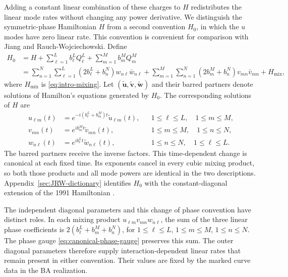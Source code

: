 Adding a constant linear combination of these charges to $H$
redistributes the linear mode rates without changing any power
derivative. We distinguish the symmetric-phase Hamiltonian $H$ from
a second convention $H_0$, in which the $u$ modes have zero linear
rate. This convention is convenient for comparison with Jiang and
Rauch-Wojciechowski. Define
\begin{align}\label{eq:canonical-H0}
 H_0&=H+\sum_{\ell=1}^{L}b_\ell^LQ_\ell^L
        +\sum_{m=1}^{M}b_m^MQ_m^M\nonumber\\
 &=\sum_{n=1}^{N}\sum_{\ell=1}^{L}
       (2b_\ell^L+b_n^N)w_{n\ell}\bar{w}_{n\ell}
   +\sum_{m=1}^{M}\sum_{n=1}^{N}
       (2b_m^M+b_n^N)v_{mn}\bar{v}_{mn}+H_{\mathrm{mix}},
\end{align}
where $H_{\mathrm{mix}}$ is \cref{eq:intro-mixing}. Let
$(\tilde{\boldsymbol u},\tilde{\boldsymbol v},\tilde{\boldsymbol w})$
and their barred partners denote solutions of Hamilton's equations
generated by $H_0$. The corresponding solutions of $H$ are
\begin{equation}\label{eq:canonical-phase-gauge}
\begin{aligned}
 u_{\ell m}(t)&=e^{-i(b_\ell^L+b_m^M)t}\tilde u_{\ell m}(t),
 &&1\leq\ell\leq L,\quad1\leq m\leq M,\\
 v_{mn}(t)&=e^{ib_m^Mt}\tilde v_{mn}(t),
 &&1\leq m\leq M,\quad1\leq n\leq N,\\
 w_{n\ell}(t)&=e^{ib_\ell^Lt}\tilde w_{n\ell}(t),
 &&1\leq n\leq N,\quad1\leq\ell\leq L.
\end{aligned}
\end{equation}
The barred partners receive the
inverse factors. This time-dependent change is canonical at each
fixed time. Its exponents cancel in every cubic mixing product, so
both those products and all mode powers are identical in the two
descriptions. Appendix~\ref{sec:JRW-dictionary} identifies $H_0$ with the
constant-diagonal extension of the 1991 Hamiltonian \cite{JRW1991}.

The independent diagonal parameters and this change of phase convention
have distinct roles. In each mixing product $u_{\ell m}v_{mn}w_{n\ell}$,
the sum of the three linear phase coefficients is
$2(b_\ell^L+b_m^M+b_n^N)$, for
$1\leq\ell\leq L$, $1\leq m\leq M$, $1\leq n\leq N$.
The phase gauge \cref{eq:canonical-phase-gauge} preserves this sum.
The outer diagonal parameters therefore supply interaction-dependent
linear rates that remain present in either convention. Their values
are fixed by the marked curve data in the BA realization.


